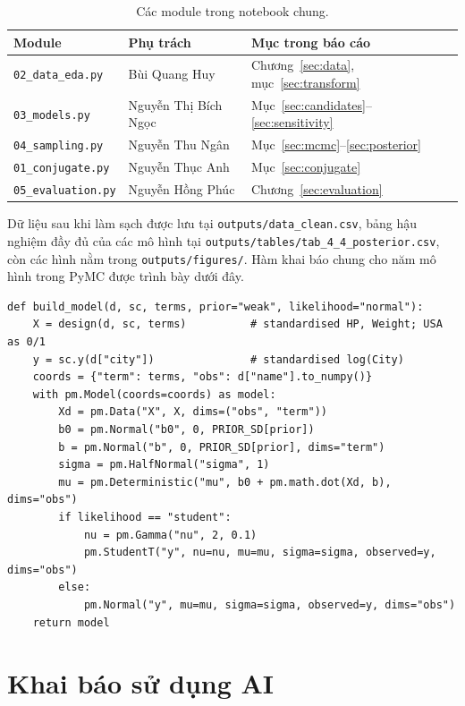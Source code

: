 \documentclass[12pt,a4paper]{report}
\begin{document}
\begin{table}[tp]
  \centering
  \caption{Các module trong notebook chung.}
  \label{tab:modules}
  \begin{tabular}{lll}
    \toprule
    Module & Phụ trách & Mục trong báo cáo \\
    \midrule
    \texttt{02\_data\_eda.py}   & Bùi Quang Huy & Chương~\ref{sec:data}, mục~\ref{sec:transform} \\
    \texttt{03\_models.py}      & Nguyễn Thị Bích Ngọc & Mục~\ref{sec:candidates}--\ref{sec:sensitivity} \\
    \texttt{04\_sampling.py}    & Nguyễn Thu Ngân & Mục~\ref{sec:mcmc}--\ref{sec:posterior} \\
    \texttt{01\_conjugate.py}   & Nguyễn Thục Anh & Mục~\ref{sec:conjugate} \\
    \texttt{05\_evaluation.py}  & Nguyễn Hồng Phúc & Chương~\ref{sec:evaluation} \\
    \bottomrule
  \end{tabular}
\end{table}

Dữ liệu sau khi làm sạch được lưu tại \texttt{outputs/data\_clean.csv}, bảng hậu
nghiệm đầy đủ của các mô hình tại
\texttt{outputs/tables/tab\_4\_4\_posterior.csv}, còn các hình nằm trong
\texttt{outputs/figures/}. Hàm khai báo chung cho năm mô hình trong PyMC được
trình bày dưới đây.

\begin{lstlisting}
def build_model(d, sc, terms, prior="weak", likelihood="normal"):
    X = design(d, sc, terms)          # standardised HP, Weight; USA as 0/1
    y = sc.y(d["city"])               # standardised log(City)
    coords = {"term": terms, "obs": d["name"].to_numpy()}
    with pm.Model(coords=coords) as model:
        Xd = pm.Data("X", X, dims=("obs", "term"))
        b0 = pm.Normal("b0", 0, PRIOR_SD[prior])
        b = pm.Normal("b", 0, PRIOR_SD[prior], dims="term")
        sigma = pm.HalfNormal("sigma", 1)
        mu = pm.Deterministic("mu", b0 + pm.math.dot(Xd, b), dims="obs")
        if likelihood == "student":
            nu = pm.Gamma("nu", 2, 0.1)
            pm.StudentT("y", nu=nu, mu=mu, sigma=sigma, observed=y, dims="obs")
        else:
            pm.Normal("y", mu=mu, sigma=sigma, observed=y, dims="obs")
    return model
\end{lstlisting}

\chapter{Khai báo sử dụng AI}
\label{sec:ai}
\end{document}
